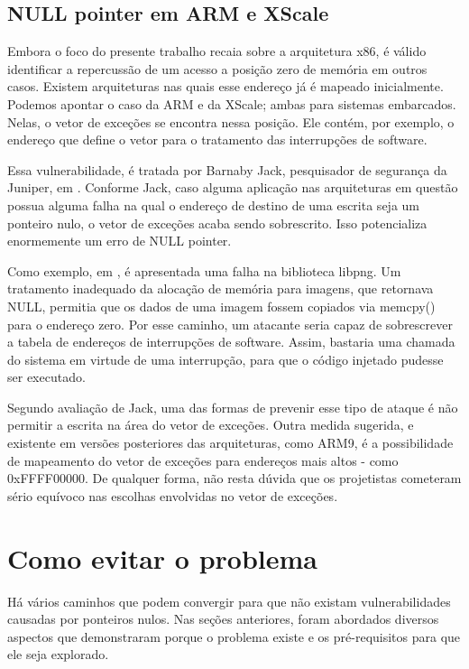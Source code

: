 		\subsection{NULL pointer em ARM e XScale}
		\label{subsec:null_pointer_arm_xscale}
			Embora o foco do presente trabalho recaia sobre a arquitetura x86, é válido 
			identificar a repercussão de um acesso a posição zero de memória em outros casos.
			Existem arquiteturas nas quais esse endereço já é mapeado inicialmente. 
			Podemos apontar o caso da ARM e da XScale; ambas para sistemas embarcados. 
			Nelas, o vetor de exceções se encontra nessa posição. Ele contém, por exemplo,
			o endereço que define o vetor para o tratamento das interrupções de software.


			Essa vulnerabilidade, é tratada por Barnaby Jack, pesquisador de segurança da Juniper,
			em \cite{Jack2007}. Conforme Jack, caso alguma aplicação nas arquiteturas em questão
			possua alguma falha na qual o endereço de destino de uma escrita seja um ponteiro nulo,
			o vetor de exceções acaba sendo sobrescrito. Isso potencializa enormemente um erro
			de NULL pointer.


			Como exemplo, em \cite{Jack2007}, é apresentada uma falha na biblioteca libpng.
			Um tratamento inadequado da alocação de memória para imagens, que
			retornava NULL, permitia que os dados de uma imagem fossem copiados
			via memcpy() para o endereço zero. Por esse caminho, um atacante seria capaz
			de sobrescrever a tabela de endereços de interrupções de software.
			Assim, bastaria uma chamada do sistema em virtude de uma interrupção,
			para que o código injetado pudesse ser executado.

			
			Segundo avaliação de Jack, uma das formas de prevenir esse tipo de ataque é
			não permitir a escrita na área do vetor de exceções. Outra medida sugerida,
			e existente em versões posteriores das arquiteturas, como ARM9, é a possibilidade
			de mapeamento do vetor de exceções para endereços mais altos - como 0xFFFF00000.
			De qualquer forma, não resta dúvida que os projetistas cometeram sério
			equívoco nas escolhas envolvidas no vetor de exceções.
				
						

	\section{Como evitar o problema}
		Há vários caminhos que podem convergir para que não existam vulnerabilidades causadas 
		por ponteiros nulos. Nas seções anteriores, foram abordados diversos aspectos que
		demonstraram porque o problema existe e os pré-requisitos para que ele seja explorado.
		

